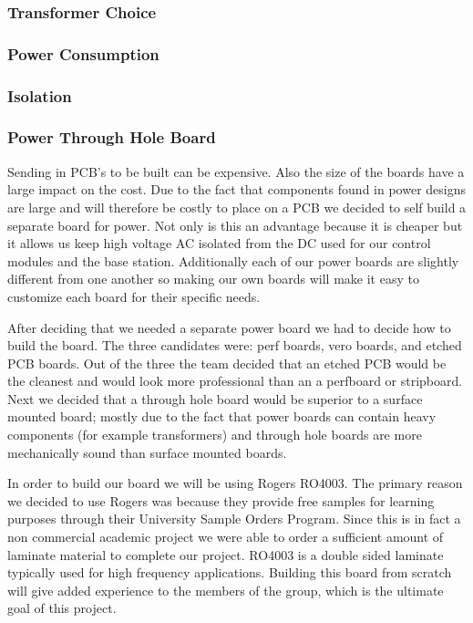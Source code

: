 
\subsubsection{Transformer Choice}

\subsubsection{Power Consumption}

\subsubsection{Isolation}

\subsubsection{Power Through Hole Board}
\label{sec:power-through}
Sending in PCB{}'s to be built can be expensive. Also the size of the boards
have a large impact on the cost. Due to the fact that components found in power
designs are large and will therefore be costly to place on a PCB we decided to
self build a separate board for power. Not only is this an advantage because it
is cheaper but it allows us keep high voltage AC isolated from the DC used for
our control modules and the base station. Additionally each of our power boards
are slightly different from one another so making our own boards will make it
easy to customize each board for their specific needs.

After deciding that we needed a separate power board we had to decide how to
build the board. The three candidates were: perf boards, vero boards, and
etched PCB boards. Out of the three the team decided that an etched PCB would
be the cleanest and would look more professional than an a perfboard or
stripboard. Next we decided that a through hole board would be superior to a
surface mounted board; mostly due to the fact that power boards can contain
heavy components (for example transformers) and through hole boards are more
mechanically sound than surface mounted boards.

In order to build our board we will be using Rogers RO4003. The primary reason
we decided to use Rogers was because they provide free samples for learning
purposes through their University Sample Orders Program. Since this is in fact
a non commercial academic project we were able to order a sufficient amount of
laminate material to complete our project.  RO4003 is a double sided laminate
typically used for high frequency applications. Building this board from
scratch will give added experience to the members of the group, which is the
ultimate goal of this project.

